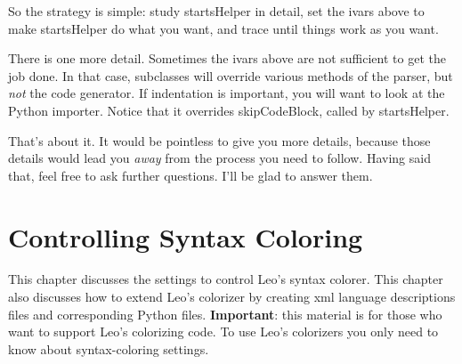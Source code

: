 \documentclass[a4paper,10pt,english]{sphinxmanual}
\begin{document}
So the strategy is simple: study startsHelper in detail, set the ivars above to
make startsHelper do what you want, and trace until things work as you want.

There is one more detail. Sometimes the ivars above are not sufficient to get
the job done. In that case, subclasses will override various methods of the
parser, but \emph{not} the code generator. If indentation is important, you will want
to look at the Python importer. Notice that it overrides skipCodeBlock, called
by startsHelper.

That's about it. It would be pointless to give you more details, because those
details would lead you \emph{away} from the process you need to follow. Having said
that, feel free to ask further questions. I'll be glad to answer them.


\chapter{Controlling Syntax Coloring}
\label{coloring:controlling-syntax-coloring}\label{coloring::doc}
This chapter discusses the settings to control Leo's syntax colorer. This
chapter also discusses how to extend Leo's colorizer by creating xml language
descriptions files and corresponding Python files. \textbf{Important}: this material
is for those who want to support Leo's colorizing code. To use Leo's colorizers
you only need to know about syntax-coloring settings.
\end{document}
